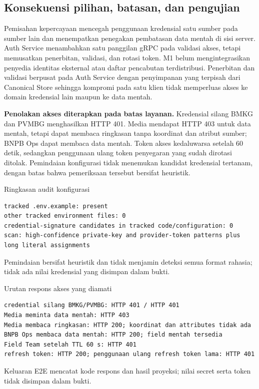 \documentclass{fairmeta}
\begin{document}
\subsection{Konsekuensi pilihan, batasan, dan pengujian}

Pemisahan kepercayaan mencegah penggunaan kredensial satu sumber pada sumber lain dan menempatkan penegakan pembatasan data mentah di sisi server. Auth Service menambahkan satu panggilan gRPC pada validasi akses, tetapi memusatkan penerbitan, validasi, dan rotasi token. M1 belum mengintegrasikan penyedia identitas eksternal atau daftar pencabutan terdistribusi. Penerbitan dan validasi berpusat pada Auth Service dengan penyimpanan yang terpisah dari Canonical Store sehingga kompromi pada satu klien tidak memperluas akses ke domain kredensial lain maupun ke data mentah.

\textbf{Penolakan akses diterapkan pada batas layanan.} Kredensial silang BMKG dan PVMBG menghasilkan HTTP 401. Media mendapat HTTP 403 untuk data mentah, tetapi dapat membaca ringkasan tanpa koordinat dan atribut sumber; BNPB Ops dapat membaca data mentah. Token akses kedaluwarsa setelah 60 detik, sedangkan penggunaan ulang token penyegaran yang sudah dirotasi ditolak. Pemindaian konfigurasi tidak menemukan kandidat kredensial tertanam, dengan batas bahwa pemeriksaan tersebut bersifat heuristik.

\begin{evidencebox}{Ringkasan audit konfigurasi}
\begin{lstlisting}
tracked .env.example: present
other tracked environment files: 0
credential-signature candidates in tracked code/configuration: 0
scan: high-confidence private-key and provider-token patterns plus long literal assignments
\end{lstlisting}
\noindent\small Pemindaian bersifat heuristik dan tidak menjamin deteksi semua format rahasia; tidak ada nilai kredensial yang disimpan dalam bukti.
\end{evidencebox}

\begin{evidencebox}{Urutan respons akses yang diamati}
\begin{lstlisting}
credential silang BMKG/PVMBG: HTTP 401 / HTTP 401
Media meminta data mentah: HTTP 403
Media membaca ringkasan: HTTP 200; koordinat dan attributes tidak ada
BNPB Ops membaca data mentah: HTTP 200; field mentah tersedia
Field Team setelah TTL 60 s: HTTP 401
refresh token: HTTP 200; penggunaan ulang refresh token lama: HTTP 401
\end{lstlisting}
\noindent\small Keluaran E2E mencatat kode respons dan hasil proyeksi; nilai secret serta token tidak disimpan dalam bukti.
\end{evidencebox}
\end{document}
